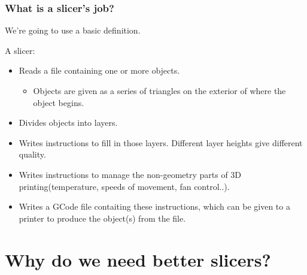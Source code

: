 \documentclass[hyperref={pdfpagemode=FullScreen},aspectratio=169]{beamer}
\begin{document}
\begin{frame}
  \frametitle{What is a slicer's job?}
  We're going to use a basic definition.\par
  \par
  A slicer:
  \begin{itemize}
  \item Reads a file containing one or more objects.
    \begin {itemize}
    \item Objects are given as a series of triangles on the exterior of where the object begins.
    \end{itemize}
  \item Divides objects into layers.
  \item Writes instructions to fill in those layers. Different layer heights give different quality.
  \item Writes instructions to manage the non-geometry parts of 3D printing(temperature, speeds of movement, fan control..).
  \item Writes a GCode file contaiting these instructions, which can be given to a printer to produce the object(s) from the file.
  \end{itemize}
\end{frame}

\section{Why do we need better slicers?}
\end{document}
